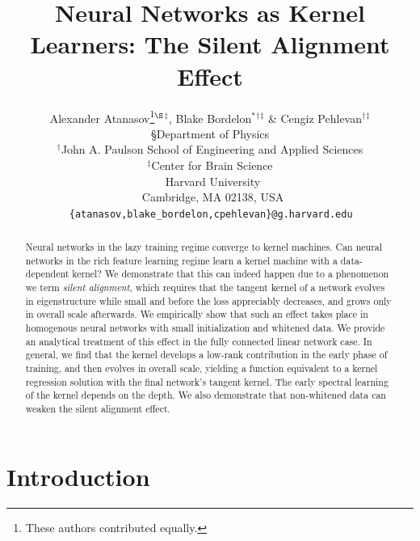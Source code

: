 \documentclass{article} %
\title{Neural Networks as Kernel Learners: The Silent Alignment Effect}
\author{Alexander Atanasov\thanks{These authors contributed equally.}\text{  \,}$^{\S}$$^{\ddagger}$, \text{ } Blake Bordelon$^{*}$$^{\dagger}$$^{\ddagger}$ \& Cengiz Pehlevan$^{\dagger}$$^{\ddagger}$  \\
\S Department of Physics
\\
$^{\dagger}$John A. Paulson School of Engineering and Applied Sciences\\
$^{\ddagger}$Center for Brain Science\\
\, Harvard University\\
\, Cambridge, MA 02138, USA \\
\,\texttt{\{atanasov,blake\_bordelon,cpehlevan\}@g.harvard.edu} \\
}
\begin{document}
\maketitle

\begin{abstract}

Neural networks in the lazy training regime converge to kernel machines. Can neural networks in the rich feature learning regime learn a kernel machine with a data-dependent kernel? We demonstrate that this can indeed happen due to a phenomenon we term \textit{silent alignment}, which requires that the tangent kernel of a network evolves in eigenstructure while small  and before the loss appreciably decreases, and grows only in overall scale afterwards. 
We empirically show that such an effect takes place in homogenous neural networks with small initialization and whitened data. We provide an analytical treatment of this effect in the fully connected linear network case. In general, we find that the kernel develops a low-rank contribution in the early phase of training, and then evolves in overall scale, yielding a function equivalent to a kernel regression solution with the final network's tangent kernel. The early spectral learning of the kernel depends on the depth.  We also demonstrate that non-whitened data can weaken the silent alignment effect.

\end{abstract}





\section{Introduction}
\end{document}
